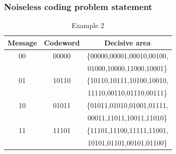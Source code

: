\documentclass[14pt]{beamer}
\begin{document}
\begin{frame}
\frametitle{Noiseless coding problem statement}


   
    \begin{table}[htbp]
    \begin{center}
    \caption{Example 2}
    \begin{tabular}
        {|c|c|c|} \hline %
        Message & Codeword & Decisive area \\ \hline %
        00& 00000& \{00000,00001,00010,00100,  \\
          &      &   01000,10000,11000,10001\} \\  \hline %
        01& 10110& \{10110,10111,10100,10010, \\
          &      &   11110,00110,01110,00111\} \\  \hline %
        10& 01011& \{01011,01010,01001,01111,  \\
          &      &   00011,11011,10011,11010\} \\  \hline %
        11& 11101& \{11101,11100,11111,11001,  \\
          &      &   10101,01101,00101,01100\} \\ \hline %
    \end{tabular}
    \end{center}
    \end{table}

\end{frame}
\end{document}
